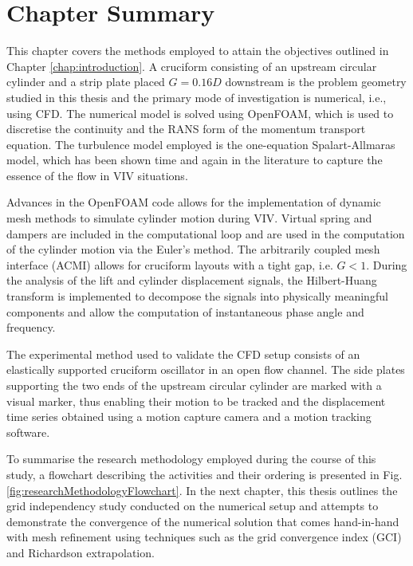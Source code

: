 \documentclass[oneside]{utmthesis}
\begin{document}
%

\section{Chapter Summary} \label{sec:chapSumMethod}
This chapter covers the methods employed to attain the objectives outlined in Chapter \ref{chap:introduction}. A cruciform consisting of an upstream circular cylinder and a strip plate placed $G=0.16D$ downstream is the problem geometry studied in this thesis and the primary mode of investigation is numerical, i.e., using CFD. The numerical model is solved using OpenFOAM, which is used to discretise the continuity and the RANS form of the momentum transport equation. The turbulence model employed is the one-equation Spalart-Allmaras model, which has been shown time and again in the literature to capture the essence of the flow in VIV situations.

Advances in the OpenFOAM code allows for the implementation of dynamic mesh methods to simulate cylinder motion during VIV. Virtual spring and dampers are included in the computational loop and are used in the computation of the cylinder motion via the Euler's method. The arbitrarily coupled mesh interface (ACMI) allows for cruciform layouts with a tight gap, i.e. $G < 1$. During the analysis of the lift and cylinder displacement signals, the Hilbert-Huang transform is implemented to decompose the signals into physically meaningful components and allow the computation of instantaneous phase angle and frequency.

The experimental method used to validate the CFD setup consists of an elastically supported cruciform oscillator in an open flow channel. The side plates supporting the two ends of the upstream circular cylinder are marked with a visual marker, thus enabling their motion to be tracked and the displacement time series obtained using a motion capture camera and a motion tracking software.

To summarise the research methodology employed during the course of this study, a flowchart describing the activities and their ordering is presented in Fig. \ref{fig:researchMethodologyFlowchart}. In the next chapter, this thesis outlines the grid independency study conducted on the numerical setup and attempts to demonstrate the convergence of the numerical solution that comes hand-in-hand with mesh refinement using techniques such as the grid convergence index (GCI) and Richardson extrapolation. 
\end{document}

